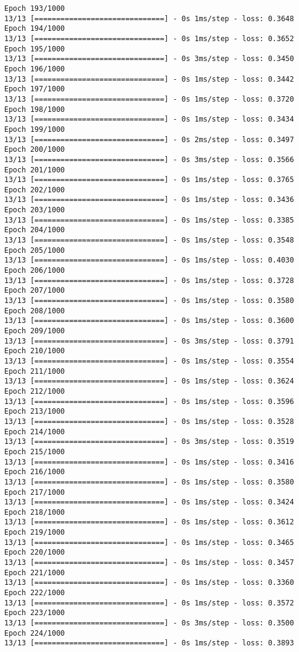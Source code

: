 \documentclass[11pt]{article}
\begin{document}
\begin{Verbatim}[commandchars=\\\{\}]
Epoch 193/1000
13/13 [==============================] - 0s 1ms/step - loss: 0.3648
Epoch 194/1000
13/13 [==============================] - 0s 1ms/step - loss: 0.3652
Epoch 195/1000
13/13 [==============================] - 0s 3ms/step - loss: 0.3450
Epoch 196/1000
13/13 [==============================] - 0s 1ms/step - loss: 0.3442
Epoch 197/1000
13/13 [==============================] - 0s 1ms/step - loss: 0.3720
Epoch 198/1000
13/13 [==============================] - 0s 1ms/step - loss: 0.3434
Epoch 199/1000
13/13 [==============================] - 0s 2ms/step - loss: 0.3497
Epoch 200/1000
13/13 [==============================] - 0s 3ms/step - loss: 0.3566
Epoch 201/1000
13/13 [==============================] - 0s 1ms/step - loss: 0.3765
Epoch 202/1000
13/13 [==============================] - 0s 1ms/step - loss: 0.3436
Epoch 203/1000
13/13 [==============================] - 0s 1ms/step - loss: 0.3385
Epoch 204/1000
13/13 [==============================] - 0s 1ms/step - loss: 0.3548
Epoch 205/1000
13/13 [==============================] - 0s 1ms/step - loss: 0.4030
Epoch 206/1000
13/13 [==============================] - 0s 1ms/step - loss: 0.3728
Epoch 207/1000
13/13 [==============================] - 0s 1ms/step - loss: 0.3580
Epoch 208/1000
13/13 [==============================] - 0s 1ms/step - loss: 0.3600
Epoch 209/1000
13/13 [==============================] - 0s 3ms/step - loss: 0.3791
Epoch 210/1000
13/13 [==============================] - 0s 1ms/step - loss: 0.3554
Epoch 211/1000
13/13 [==============================] - 0s 1ms/step - loss: 0.3624
Epoch 212/1000
13/13 [==============================] - 0s 1ms/step - loss: 0.3596
Epoch 213/1000
13/13 [==============================] - 0s 1ms/step - loss: 0.3528
Epoch 214/1000
13/13 [==============================] - 0s 3ms/step - loss: 0.3519
Epoch 215/1000
13/13 [==============================] - 0s 1ms/step - loss: 0.3416
Epoch 216/1000
13/13 [==============================] - 0s 1ms/step - loss: 0.3580
Epoch 217/1000
13/13 [==============================] - 0s 1ms/step - loss: 0.3424
Epoch 218/1000
13/13 [==============================] - 0s 1ms/step - loss: 0.3612
Epoch 219/1000
13/13 [==============================] - 0s 1ms/step - loss: 0.3465
Epoch 220/1000
13/13 [==============================] - 0s 1ms/step - loss: 0.3457
Epoch 221/1000
13/13 [==============================] - 0s 1ms/step - loss: 0.3360
Epoch 222/1000
13/13 [==============================] - 0s 1ms/step - loss: 0.3572
Epoch 223/1000
13/13 [==============================] - 0s 3ms/step - loss: 0.3500
Epoch 224/1000
13/13 [==============================] - 0s 1ms/step - loss: 0.3893

\end{Verbatim}
\end{document}

